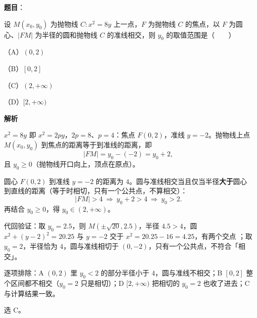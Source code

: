 \begin{answer}

\textbf{题目}：

设 $M(x_0,y_0)$ 为抛物线 $C:x^2=8y$ 上一点，$F$ 为抛物线 $C$ 的焦点，以 $F$ 为圆心、$|FM|$ 为半径的圆和抛物线 $C$ 的准线相交，则 $y_0$ 的取值范围是\mbox{（　　）}

（A）$(0,2)$

（B）$[0,2]$

（C）$(2,+\infty)$

（D）$[2,+\infty)$

\textbf{解析}

$x^2=8y$ 即 $x^2=2py$，$2p=8$、$p=4$：焦点 $F(0,2)$，准线 $y=-2$。抛物线上点 $M(x_0,y_0)$ 到焦点的距离等于到准线的距离，即
\nopagebreak[4]
\[
|FM|=y_0-(-2)=y_0+2,
\]
且 $y_0\geqslant0$（抛物线开口向上，顶点在原点）。

圆心 $F(0,2)$ 到准线 $y=-2$ 的距离为 $4$。圆与准线相交当且仅当半径\textbf{大于}圆心到直线的距离（等于时相切，只有一个公共点，不算相交）：
\nopagebreak[4]
\[
|FM|>4\ \Longrightarrow\ y_0+2>4\ \Longrightarrow\ y_0>2.
\]
再结合 $y_0\geqslant0$，得 $y_0\in(2,+\infty)$。

代回验证：取 $y_0=2.5$，则 $M(\pm\sqrt{20},2.5)$，半径 $4.5>4$，圆 $x^2+(y-2)^2=20.25$ 与 $y=-2$ 交于 $x^2=20.25-16=4.25$，有两个交点 ；取 $y_0=2$，半径恰为 $4$，圆与准线相切于 $(0,-2)$，只有一个公共点，不符合「相交」。

逐项排除：A $(0,2)$ 里 $y_0<2$ 的部分半径小于 $4$，圆与准线不相交；B $[0,2]$ 整个区间都不相交（$y_0=2$ 只是相切）；D $[2,+\infty)$ 把相切的 $y_0=2$ 也收了进去；C 与计算结果一致。

选 C。


\end{answer}
